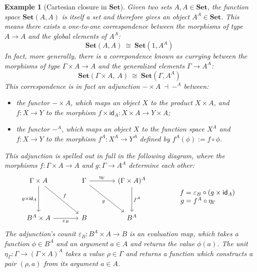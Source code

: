 \documentclass[draft,11pt]{report}
\newtheorem{example}[theorem]{Example}
\theoremstyle{definition}
\newcommand{\kw}[1]{\ensuremath{ \mathsf{#1} }}
\begin{document}
\begin{example}[Cartesian closure in $\mathbf{Set}$]
Given two sets $A, A \in \mathbf{Set}$,
the function space $\mathbf{Set}(A, A)$
is itself a set
and therefore gives an object $A^A \in \mathbf{Set}$.
This means there exists a one-to-one correspondence
between the morphisms of type $A \rightarrow A$
and the global elements of $A^A$:
\[
  \mathbf{Set}(A, A)
  \: \cong \:
  \mathbf{Set}(1, A^A)
\]
In fact, more generally,
there is a correpondence known as \emph{currying}
between the morphisms of type
$\Gamma \times A \rightarrow A$
and the generalized elements
$\Gamma \rightarrow A^A$:
\[
  \mathbf{Set}(\Gamma \times A, \: A)
  \: \cong \:
  \mathbf{Set}(\Gamma, A^A)
\]
This correspondence is in fact
an adjunction
$
  {-} \times A \: \dashv \: {-}^A
$
between:
\begin{itemize}
  \item the functor ${-} \times A$,
    which maps an object $X$ to the product $X \times A$,
    and $f : X \rightarrow Y$ to the morphism
    $f \times \kw{id}_A : X \times A \rightarrow Y \times A$;
  \item the functor ${-}^A$,
    which maps an object $X$ to the function space $X^A$
    and $f : X \rightarrow Y$ to the morphism
    $f^A : X^A \rightarrow Y^A$
    defined by
    $
      f^A(\phi) := f \circ \phi
    $.
\end{itemize}
This adjunction
is spelled out in full in the following diagram,
where the morphisms
$f : \Gamma \times A \rightarrow A$ and
$g : \Gamma \rightarrow A^A$
determine each other:
\[
  \begin{tikzcd}[row sep=huge, column sep=large]
    \Gamma \times A
      \ar[d, "g \times \kw{id}_A"']
      \ar[dr, "f"] &
    \Gamma
      \ar[r, "\eta_\Gamma"]
      \ar[dr, "g"'] &
    (\Gamma \times A)^A
      \ar[d, "f^A"] \\
    B^A \times A
      \ar[r, "\varepsilon_B"'] &
    B &
    B^A
  \end{tikzcd}
  \qquad \qquad
  \begin{array}{r@{{} = {}}l}
    f & \varepsilon_B \circ (g \times \kw{id}_A) \\
    g & f^A \circ \eta_\Gamma
  \end{array}
\]
The adjunction's counit $\varepsilon_B : B^A \times A \rightarrow B$
is an \emph{evaluation map},
which takes a function $\phi \in B^A$ and an argument $a \in A$
and returns the value $\phi(a)$.
The unit $\eta_\Gamma : \Gamma \rightarrow (\Gamma \times A)^A$
takes a value $\rho \in \Gamma$ and returns a function
which constructs a pair $(\rho, a)$ from its argument $a \in A$.
\end{example}
\end{document}
